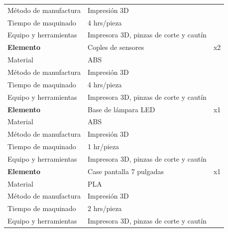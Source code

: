 \begin{longtable}{@{} p{4.2cm} p{8.8cm} r @{}}
Método de manufactura & Impresión 3D                                                       &    \\
Tiempo de maquinado   & 4 hrs/pieza                                                        &    \\
Equipo y herramientas & Impresora 3D, pinzas de corte y cautín                             &    \\
\midrule
\textbf{Elemento}     & Coples de sensores                                                 & x2 \\
Material              & ABS                                                                &    \\
Método de manufactura & Impresión 3D                                                       &    \\
Tiempo de maquinado   & 4 hrs/pieza                                                        &    \\
Equipo y herramientas & Impresora 3D, pinzas de corte y cautín                             &    \\
\midrule
\textbf{Elemento}     & Base de lámpara LED                                                & x1 \\
Material              & ABS                                                                &    \\
Método de manufactura & Impresión 3D                                                       &    \\
Tiempo de maquinado   & 1 hr/pieza                                                         &    \\
Equipo y herramientas & Impresora 3D, pinzas de corte y cautín                             &    \\
\midrule
\textbf{Elemento}     & Case pantalla 7 pulgadas                                           & x1 \\
Material              & PLA                                                                &    \\
Método de manufactura & Impresión 3D                                                       &    \\
Tiempo de maquinado   & 2 hrs/pieza                                                        &    \\
Equipo y herramientas & Impresora 3D, pinzas de corte y cautín                             &    \\
\midrule

\end{longtable}
